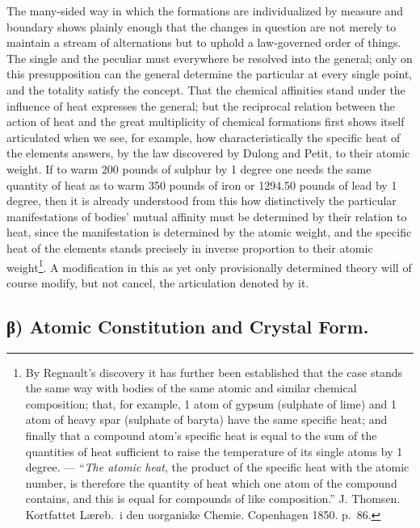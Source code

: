 \documentclass[12pt,a4paper]{book}
\begin{document}
The many-sided way in which the formations are individualized by measure and
boundary shows plainly enough that the changes in question are not merely to
maintain a stream of alternations but to uphold a law-governed order of things.
The single and the peculiar must everywhere be resolved into the general; only
on this presupposition can the general determine the particular at every single
point, and the totality satisfy the concept. That the chemical affinities stand
under the influence of heat expresses the general; but the reciprocal relation
between the action of heat and the great multiplicity of chemical formations
first shows itself articulated when we see, for example, how characteristically
the specific heat of the elements answers, by the law discovered by Dulong and
Petit, to their atomic weight. If to warm 200 pounds of sulphur by 1 degree one
needs the same quantity of heat as to warm 350 pounds of iron or 1294.50 pounds
of lead by 1 degree, then it is already understood from this how distinctively
the particular manifestations of bodies' mutual affinity must be determined by
their relation to heat, since the manifestation is determined by the atomic
weight, and the specific heat of the elements stands precisely in inverse
proportion to their atomic
weight\footnote{By Regnault's discovery it has further been established that
the case stands the same way with bodies of the same atomic and similar
chemical composition; that, for example, 1 atom of gypsum (sulphate of lime)
and 1 atom of heavy spar (sulphate of baryta) have the same specific heat; and
finally that a compound atom's specific heat is equal to the sum of the
quantities of heat sufficient to raise the temperature of its single atoms by 1
degree. --- ``\emph{The atomic heat}, the product of the specific heat with the
atomic number, is therefore the quantity of heat which one atom of the compound
contains, and this is equal for compounds of like composition.'' J. Thomsen.
Kortfattet Læreb.\ i den uorganiske Chemie. Copenhagen 1850. p.~86.}. A
modification in this as yet only provisionally
determined theory will of course modify, but not cancel, the articulation
denoted by it.

\subsection*{β) Atomic Constitution and Crystal Form.}
\end{document}
